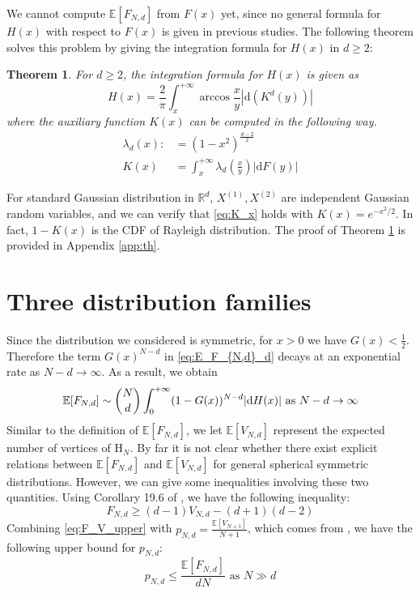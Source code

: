 \documentclass[conference,a4paper]{IEEEtran}
\def\E{\mathbb{E}}
\def\R{\mathbb{R}}
\def\dd{\mathrm{d}}
\newtheorem{theorem}{Theorem}
\begin{document}
We cannot compute $\E[F_{N,d}]$ from $F(x)$ yet, since no general formula for $H(x)$ with respect to $F(x)$ is given in previous studies.
The following theorem solves this problem by giving the integration formula for $H(x)$ in $d\geq 2$:
\begin{theorem}\label{thm:H}
For $d\geq 2$, the integration formula for $H(x)$ is given as
\begin{equation}
     H(x) = \frac{2}{\pi}
     \int_x^{+\infty} \arccos\frac{x}{y}
     |\mathrm{d} (K^d(y))|\label{eq:H_expression_d_dim}
\end{equation}
where the auxiliary function $K(x)$ can be computed in the following way.
\begin{align}
     \lambda_d(x)  :&=(1-x^2)^{\frac{d-2}{2}}
     \label{eq:lambda_r}\\
     K(x)&=
        \int_x^{+\infty} 
     \lambda_d \left(\frac{x}{y} \right)|\dd F(y)|
     \label{eq:K_x}
\end{align}
\end{theorem}
For standard Gaussian distribution in $\R^d$,
$X^{(1)}, X^{(2)}$ are independent
Gaussian random variables, and we can verify that \eqref{eq:K_x} holds with $K(x) = e^{-x^2/2}$.
In fact, $1-K(x)$ is the CDF of Rayleigh distribution.
The proof of Theorem \ref{thm:H}
is provided in Appendix \ref{app:th}.
\section{Three distribution families}\label{sec:three_distriutions}
Since the distribution we considered is symmetric,
for $x>0$ we have $G(x)<\frac{1}{2}$. Therefore the
term $G(x)^{N-d}$ in \eqref{eq:E_F_{N,d}_d} decays at an exponential rate as $N-d\to \infty$.
As a result, we obtain
\begin{align}
     \E[F_{N,d}] \sim \binom{N}{d} \int_0^{+\infty} 
      (1-G(x))^{N-d} |\dd H(x)| \textrm{ as } N-d\to \infty
     \label{eq:E_F_{N,d}_d_sim}
\end{align}
Similar to the definition of $\E[F_{N,d}]$,
we let $\E[V_{N,d}]$ represent the expected number of
vertices of $\mathrm{H}_N$.
By far it is not clear whether there exist explicit relations
between $\E[F_{N,d}]$ and $\E[V_{N,d}]$
for general spherical symmetric distributions.
However, we can give some inequalities involving these two
quantities. Using Corollary 19.6 of \cite{brondsted2012introduction}, we have the following
inequality:
\begin{equation}\label{eq:F_V_upper}
     F_{N,d} \geq (d-1) V_{N,d} - (d+1)(d-2)
 \end{equation}
Combining \eqref{eq:F_V_upper} with $p_{N,d} = \frac{\E[V_{N+1}]}{N+1}$, which comes from
\cite{efron1965convex}, we have the following upper bound for $p_{N,d}$:
\begin{equation}\label{eq:p_N_d_bound}
    p_{N,d} \leq \frac{\E[F_{N,d}]}{d N} \textrm{ as } N \gg d
\end{equation}
\end{document}
